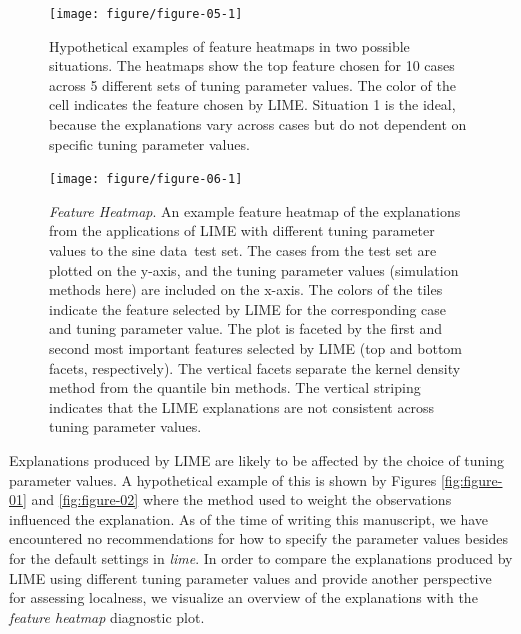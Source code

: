 \documentclass[AMS,STIX2COL]{WileyNJD-v2}\usepackage[]{graphicx}\usepackage[]{color}
\newenvironment{knitrout}{}{} %
\newcommand{\data}{sine data}
\begin{document}
\begin{figure}[!thp]
\begin{knitrout}
\color{fgcolor}

{\centering \texttt{[image: figure/figure-05-1]} 

}



\end{knitrout}
\caption{Hypothetical examples of feature heatmaps in two possible situations. The heatmaps show the top feature chosen for 10 cases across 5 different sets of tuning parameter values. The color of the cell indicates the feature chosen by LIME. Situation 1 is the ideal, because the explanations vary across cases but do not dependent on specific tuning parameter values.}
\label{fig:figure-05}

\vspace*{\floatsep}

\begin{knitrout}
\color{fgcolor}

{\centering \texttt{[image: figure/figure-06-1]} 

}



\end{knitrout}
\caption{\emph{Feature Heatmap}. An example feature heatmap of the explanations from the applications of LIME with different tuning parameter values to the \data \ test set. The cases from the test set are plotted on the y-axis, and the tuning parameter values (simulation methods here) are included on the x-axis. The colors of the tiles indicate the feature selected by LIME for the corresponding case and tuning parameter value. The plot is faceted by the first and second most important features selected by LIME (top and bottom facets, respectively). The vertical facets separate the  kernel density method from the quantile bin methods. The vertical striping indicates that the LIME explanations are not consistent across tuning parameter values.}
\label{fig:figure-06}
\end{figure}

Explanations produced by LIME are likely to be affected by the choice of tuning parameter values. A hypothetical example of this is shown by Figures \ref{fig:figure-01} and \ref{fig:figure-02} where the method used to weight the observations influenced the explanation. As of the time of writing this manuscript, we have encountered no recommendations for how to specify the parameter values besides for the default settings in \emph{lime}. In order to compare the explanations produced by LIME using different tuning parameter values and provide another perspective for assessing localness, we visualize an overview of the explanations with the \emph{feature heatmap} diagnostic plot. 
\end{document}
